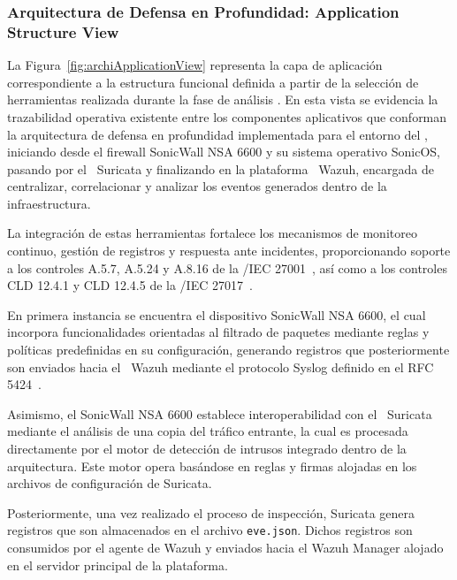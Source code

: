 
\subsubsection{Arquitectura de Defensa en Profundidad: Application Structure View}
\noindent

La Figura~\ref{fig:archiApplicationView} representa la capa de aplicación correspondiente a la estructura funcional definida a partir de la selección de herramientas 
realizada durante la fase de análisis \DAR. En esta vista se evidencia la trazabilidad operativa existente entre los componentes 
aplicativos que conforman la arquitectura de defensa en profundidad implementada para el entorno del \GRID, iniciando desde el firewall 
SonicWall NSA 6600 y su sistema operativo SonicOS, pasando por el \IDPS\ Suricata y finalizando en la plataforma \SIEM\ Wazuh, encargada de 
centralizar, correlacionar y analizar los eventos generados dentro de la infraestructura.

La integración de estas herramientas fortalece los mecanismos de monitoreo continuo, gestión de registros y respuesta ante incidentes, 
proporcionando soporte a los controles A.5.7, A.5.24 y A.8.16 de la \ISO/IEC 27001~\cite{iso27001}, así como a los controles CLD 12.4.1 y 
CLD 12.4.5 de la \ISO/IEC 27017~\cite{iso27017}.

En primera instancia se encuentra el dispositivo SonicWall NSA 6600, el cual incorpora funcionalidades orientadas al filtrado de paquetes 
mediante reglas y políticas predefinidas en su configuración, generando registros que posteriormente son enviados hacia el \SIEM\ Wazuh 
mediante el protocolo Syslog definido en el RFC 5424~\cite{rfc5424}.

Asimismo, el SonicWall NSA 6600 establece interoperabilidad con el \IDPS\ Suricata mediante el análisis de una copia del tráfico entrante, 
la cual es procesada directamente por el motor de detección de intrusos integrado dentro de la arquitectura. Este motor opera basándose en 
reglas y firmas alojadas en los archivos de configuración de Suricata.

Posteriormente, una vez realizado el proceso de inspección, Suricata genera registros que son almacenados en el archivo 
\texttt{eve.json}. Dichos registros son consumidos por el agente de Wazuh y enviados hacia el Wazuh Manager alojado en el servidor 
principal de la plataforma.

